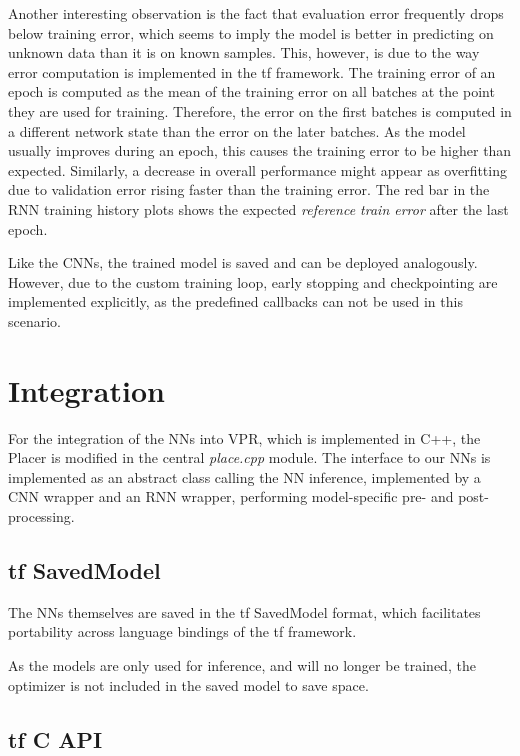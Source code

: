 Another interesting observation is the fact that evaluation error frequently drops below training error, which seems to imply the model is better in predicting on unknown data than it is on known samples. This, however, is due to the way error computation is implemented in the \gls{tf} framework\cite{keras-faq-web}. The training error of an epoch is computed as the mean of the training error on all batches at the point they are used for training. Therefore, the error on the first batches is computed in a different network state than the error on the later batches. As the model usually improves during an epoch, this causes the training error to be higher than expected. Similarly, a decrease in overall performance might appear as overfitting due to validation error rising faster than the training error. The red bar in the \gls{RNN} training history plots shows the expected \textit{reference train error} after the last epoch.

Like the \glspl{CNN}, the trained model is saved and can be deployed analogously. However, due to the custom training loop, early stopping and checkpointing are implemented explicitly, as the predefined callbacks can not be used in this scenario.

\section{Integration}

For the integration of the \glspl{NN} into \gls{VPR}, which is implemented in C++, the Placer is modified in the central \textit{place.cpp} module. The interface to our \glspl{NN} is implemented as an abstract class calling the \gls{NN} inference, implemented by a \gls{CNN} wrapper and an \gls{RNN} wrapper, performing model-specific pre- and post-processing.

\subsection{\gls{tf} SavedModel}

The \glspl{NN} themselves are saved in the \gls{tf} SavedModel format, which facilitates portability across language bindings of the \gls{tf} framework. 
	
As the models are only used for inference, and will no longer be trained, the optimizer is not included in the saved model to save space.

\subsection{\gls{tf} C API}\label{ch:tf-c-compile}

